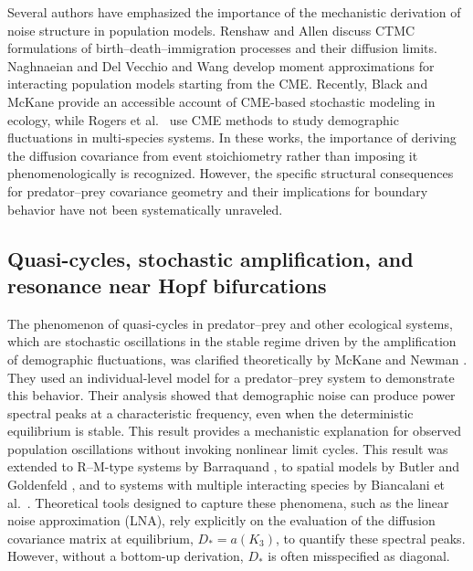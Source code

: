 \documentclass[pdflatex,sn-mathphys-ay]{sn-jnl}
\theoremstyle{thmstyleone}
\theoremstyle{definition}
\theoremstyle{remark}
\begin{document}
Several authors have emphasized the importance of the mechanistic derivation of noise structure in population models. 
Renshaw \citep{renshaw_modelling_1995} and Allen \citep{allen_introduction_2010} discuss CTMC formulations of birth--death--immigration processes and their diffusion limits. 
Naghnaeian and Del Vecchio \citep{naghnaeian_robust_2017} and Wang \citep{wang_analysis_2025-1} develop moment approximations for interacting population models starting from the CME. 
Recently, Black and McKane \citep{black_stochastic_2012} provide an accessible account of CME-based stochastic modeling in ecology, while Rogers et al.\ \citep{rogers_demographic_2012} use CME methods to study demographic fluctuations in multi-species systems. 
In these works, the importance of deriving the diffusion covariance from event stoichiometry rather than imposing it phenomenologically is recognized.
However, the specific structural consequences for predator--prey covariance geometry and their implications for boundary behavior have not been systematically unraveled.

\subsection{Quasi-cycles, stochastic amplification, and resonance near Hopf bifurcations}

The phenomenon of quasi-cycles in predator--prey and other ecological systems, which are stochastic oscillations in the stable regime driven by the amplification of demographic fluctuations, was clarified theoretically by McKane and Newman \citep{mckane_predator-prey_2005}.
They used an individual-level model for a predator--prey system to demonstrate this behavior. 
Their analysis showed that demographic noise can produce power spectral peaks at a characteristic frequency, even when the deterministic equilibrium is stable.
This result provides a mechanistic explanation for observed population oscillations without invoking nonlinear limit cycles. 
This result was extended to R--M-type systems by Barraquand \citep{barraquand_no_2023}, to spatial models by Butler and Goldenfeld \citep{butler_robust_2009,butler_fluctuation-driven_2011}, and to systems with multiple interacting species by Biancalani et al.\ \citep{biancalani_noise-induced_2012}. Theoretical tools designed to capture these phenomena, such as the linear noise approximation (LNA), rely explicitly on the evaluation of the diffusion covariance matrix at equilibrium, $D_* = a(K_3)$, to quantify these spectral peaks. However, without a bottom-up derivation, $D_*$ is often misspecified as diagonal.
\end{document}
